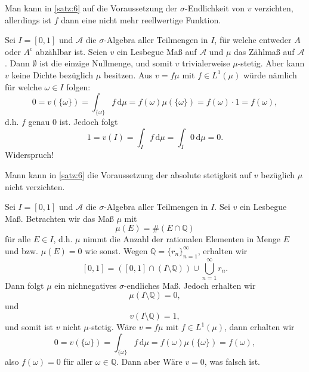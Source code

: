 \documentclass[/Users/zhangwusheng/Documents/satz von radon nikodym/satz von radon nikodym.tex]{subfiles}
\begin{document}
    \begin{remark}
        Man kann in \cref{satz:6} auf die Voraussetzung der $\sigma$-Endlichkeit von $v$ verzichten, allerdings ist $f$ dann eine nicht mehr reellwertige Funktion.  
    \end{remark}

    \begin{example}
        Sei $I=[0,1]$ und $\mathcal{A}$ die $\sigma$-Algebra aller Teilmengen in $I$, für welche entweder $A$ oder $A^{\mathrm{c}}$ abzählbar
        ist. Seien $v$ ein Lesbegue Maß auf $\mathcal{A}$ und $\mu$ das Zählmaß auf $\mathcal{A}$. Dann $\emptyset$ ist die einzige Nullmenge, und somit $v$ trivialerweise $\mu$-stetig. Aber kann 
        $v$ keine Dichte bezüglich $\mu$ besitzen. Aus $v=f \mu$ mit $f \in L^1(\mu)$ würde nämlich für welche $\omega \in I$ folgen:
        \[0= v(\{\omega\})= \int_{\{\omega\}} f\,\mathrm{d}\mu = f(\omega) \mu(\{\omega\}) = f(\omega) \cdot 1 = f(\omega),\]
        d.h. $f$ genau 0 ist. Jedoch folgt 
        \[1= v(I) = \int_{I} f\,\mathrm{d}\mu = \int_I 0\,\mathrm{d}\mu = 0.\]
        Widerspruch!
    \end{example}

    \begin{remark}
        Mann kann in \cref{satz:6} die Voraussetzung der absolute stetigkeit auf $v$ bezüglich $\mu$ nicht verzichten.
    \end{remark}

    \begin{example}
        Sei $I=[0,1]$ und $\mathcal{A}$ die $\sigma$-Algebra aller Teilmengen in $I$. Sei $v$ ein Lesbegue Maß. Betrachten wir das Maß $\mu$ mit 
        \[\mu(E) = \#(E \cap \mathbb{Q})\]
        für alle $E \in I$, d.h. $\mu$ nimmt die Anzahl der rationalen Elementen in Menge $E$ und bzw. $\mu(E)=0$ wie sonst. Wegen $\mathbb{Q}=\{r_n\}_{n=1}^\infty$, erhalten wir
        \[[0,1]=([0,1] \cap (I \setminus \mathbb{Q})) \cup \bigcup_{n=1}^\infty r_{n}.\]
        Dann folgt $\mu$ ein nichnegatives $\sigma$-endliches Maß. Jedoch erhalten wir  
        \[\mu(I \setminus \mathbb{Q})= 0,\]
        und 
        \[v(I \setminus \mathbb{Q}) = 1,\]
        und somit ist $v$ nicht $\mu$-stetig. Wäre $v= f\mu$ mit $f \in L^1(\mu)$, dann erhalten wir
        \[0= v(\{\omega\})=\int_{\{\omega\}} f\,\mathrm{d}\mu = f(\omega)\mu(\{\omega\}) =f(\omega),\]
        also $f(\omega)=0$ für aller $\omega \in \mathbb{Q}$. Dann aber Wäre $v=0$, was falsch ist. 
    \end{example}
\end{document}
